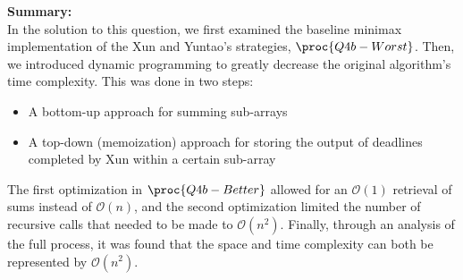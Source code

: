 \textbf{Summary:}\\
In the solution to this question, we first examined the baseline minimax implementation of the Xun and Yuntao's strategies, $\proc{Q4b-Worst}$.
Then, we introduced dynamic programming to greatly decrease the original algorithm's time complexity.
This was done in two steps:
\begin{spacing}{1}
    \begin{itemize}
        \item A bottom-up approach for summing sub-arrays
        \item A top-down (memoization) approach for storing the output of deadlines completed by Xun within a certain sub-array
    \end{itemize}
\end{spacing}

The first optimization in $\proc{Q4b-Better}$ allowed for an $\mathcal{O}(1)$ retrieval of sums instead of $\mathcal{O}(n)$, and the second optimization limited the number of recursive calls that needed to be made to $\mathcal{O}(n^2)$.
Finally, through an analysis of the full process, it was found that the space and time complexity can both be represented by $\mathcal{O}(n^2)$.